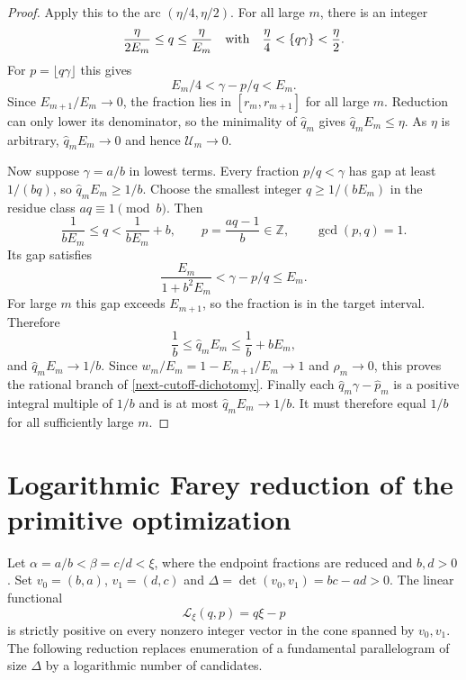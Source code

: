 \documentclass[11pt,a4paper]{article}
\theoremstyle{definition}
\theoremstyle{remark}
\begin{document}
\begin{proof}
Apply this to the arc $(\eta/4,\eta/2)$. For all large $m$, there is an
integer
\[
 \frac{\eta}{2E_m}\le q\le\frac{\eta}{E_m}
 \quad\hbox{with}\quad
 \frac\eta4<\{q\gamma\}<\frac\eta2.
\]
For $p=\lfloor q\gamma\rfloor$ this gives
\[
 E_m/4<\gamma-p/q<E_m.
\]
Since $E_{m+1}/E_m\to0$, the fraction lies in $[r_m,r_{m+1}]$ for all
large $m$. Reduction can only lower its denominator, so the minimality
of $\widehat q_m$ gives $\widehat q_m E_m\le\eta$.
As $\eta$ is arbitrary, $\widehat q_m E_m\to0$ and hence
$\mathcal U_m\to0$.

Now suppose $\gamma=a/b$ in lowest terms. Every fraction $p/q<\gamma$
has gap at least $1/(bq)$, so
$\widehat q_m E_m\ge1/b$.
Choose the smallest integer $q\ge1/(bE_m)$ in the residue class
$aq\equiv1\pmod b$. Then
\[
 \frac1{bE_m}\le q<\frac1{bE_m}+b,\qquad
 p=\frac{aq-1}{b}\in\mathbb Z,\qquad \gcd(p,q)=1.
\]
Its gap satisfies
\[
 \frac{E_m}{1+b^2E_m}<\gamma-p/q\le E_m.
\]
For large $m$ this gap exceeds $E_{m+1}$, so the fraction is in the target
interval. Therefore
\[
 \frac1b\le\widehat q_m E_m\le\frac1b+bE_m,
\]
and $\widehat q_m E_m\to1/b$. Since
$w_m/E_m=1-E_{m+1}/E_m\to1$ and $\rho_m\to0$,
this proves the rational branch of \eqref{next-cutoff-dichotomy}.
Finally each
$\widehat q_m\gamma-\widehat p_m$ is a positive integral multiple of
$1/b$ and is at most $\widehat q_m E_m\to1/b$.
It must therefore equal $1/b$ for all sufficiently large $m$.
\end{proof}




\section{Logarithmic Farey reduction of the primitive optimization}
\label{stage3-farey-section}

Let $\alpha=a/b<\beta=c/d<\xi$, where the endpoint fractions are reduced
and $b,d>0$. Set $v_0=(b,a)$, $v_1=(d,c)$ and
$\Delta=\det(v_0,v_1)=bc-ad>0$. The linear functional
\[
 \mathcal L_\xi(q,p)=q\xi-p
\]
is strictly positive on every nonzero integer vector in the cone spanned
by $v_0,v_1$. The following reduction replaces enumeration of a fundamental
parallelogram of size $\Delta$ by a logarithmic number of candidates.
\end{document}
